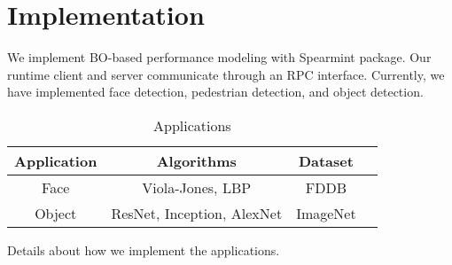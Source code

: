 \newpage

\section{Implementation}
\label{sec:implementation}

We implement BO-based performance modeling with Spearmint package. Our runtime
client and server communicate through an RPC interface. Currently, we have
implemented face detection, pedestrian detection, and object detection.

\begin{table}
  \footnotesize
  \centering
  \begin{tabular}{c c c c}
    \toprule
    Application & Algorithms & Dataset \\
    \midrule
    Face & Viola-Jones, LBP & FDDB \\
    \midrule
    Object & ResNet, Inception, AlexNet & ImageNet \\
    \bottomrule
  \end{tabular}
  \caption{\sysname{} Applications}
  \label{tab:apps}
\end{table}

\newpage

Details about how we implement the applications.

\newpage

